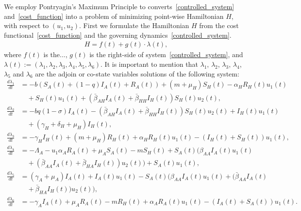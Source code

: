\documentclass[3p,sort&compress]{elsarticle}
\DeclareRobustCommand{\1}[1]{\ensuremath \mathbbm{1}_{\{#1\}}}
\begin{document}
    We employ Pontryagin's Maximum Principle to converts~\eqref{controlled_system} and~\eqref{cost_function} into a problem of minimizing point-wise Hamiltonian $H$, with respect to $(u_{1},u_{2})$. First we formulate the Hamiltonian $H$ from the cost functional~\eqref{cost_function} and the governing dynamics~\eqref{controlled_system}.
    \begin{equation}
        \begin{aligned}
            H = f(t) + g(t)\cdot \lambda(t),
         \end{aligned}
    \end{equation}
    where $f(t)$ is the..., $g(t)$ is the right-side of system~\eqref{controlled_system}, and $\lambda(t) := \left( \lambda_{1}, \lambda_{2}, \lambda_{3}, \lambda_{4}, \lambda_{5}, \lambda_{6} \right)$. It is important to mention that $\lambda_{1}$, $\lambda_{2}$, $\lambda_{3}$, $\lambda_{4}$, $\lambda_{5}$ and $\lambda_{6}$ are the adjoin or co-state variables solutions of the following system:
    \begin{equation}\label{adjoint_system}
    \begin{aligned}
        \frac{d \lambda_{1}}{dt} &=
        -b (S_{A}(t) + (1 - q) I_{A}(t) + R_{A}(t) ) + (m + \mu_{H}) S_{H}(t) - \alpha_{H} R_{H}(t) u_{1}(t)\\
        &\quad+ S_{H}(t) u_{1}(t) + (\bar{\beta}_{AH} I_{A}(t) + \bar{\beta}_{HH} I_{H}(t)) S_{H}(t) u_{2}(t),
        \\
        \frac{d \lambda_{2}}{dt} &=
        -b q (1 - \sigma) I_{A}(t) - (\bar{\beta}_{AH} I_{A}(t) + \bar{\beta}_{HH} I_{H}(t)) S_{H}(t) u_{2}(t)  + I_{H}(t) u_{1}(t)\\
        &\quad + (\gamma_{H} + \delta_{H} + \mu_{H}) I_{H}(t),
        \\
        \frac{d \lambda_{3}}{dt} &=
        -\gamma_{H} I_{H}(t) + (m + \mu_{H}) R_{H}(t) + \alpha_{H} R_{H}(t) u_{1}(t) - (I_{H}(t) + S_{H}(t)) u_{1}(t),
        \\[0.3cm]
        \frac{d \lambda_{4}}{dt} &=
        -\Lambda_{A} - u_{1} \alpha_{A} R_{A}(t) + \mu_{A} S_{A}(t) - m S_{H}(t) + S_{A}(t) (\beta_{AA} I_{A}(t) u_{1}(t)\\
        &\quad + (\bar{\beta}_{AA} I_{A}(t) + \bar{\beta}_{HA} I_{H}(t)) u_{2}(t)) + S_{A}(t) u_{1}(t),
        \\
        \frac{d \lambda_{5}}{dt} &=
        (\gamma_{A} + \mu_{A}) I_{A}(t) + I_{A}(t) u_{1}(t) - S_{A}(t) (\beta_{AA} I_{A}(t) u_{1}(t) + (\bar{\beta}_{AA} I_{A}(t)\\
        &\quad + \bar{\beta}_{HA} I_{H}(t)) u_{2}(t)),
        \\
        \frac{d \lambda_{6}}{dt} &=
        -\gamma_{A} I_{A}(t) + \mu_{A} R_{A}(t) - m R_{H}(t) + \alpha_{A} R_{A}(t) u_{1}(t) - (I_{A}(t) + S_{A}(t)) u_{1}(t).
    \end{aligned}
\end{equation}
\end{document}
